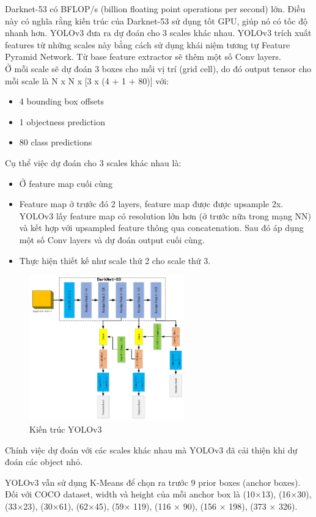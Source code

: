 \noindent Darknet-53 có BFLOP/s (billion floating point operations per second) lớn. Điều này có nghĩa rằng kiến trúc của Darknet-53 sử dụng tốt GPU, giúp nó có tốc độ nhanh hơn.
YOLOv3 đưa ra dự đoán cho 3 scales khác nhau. YOLOv3 trích xuất features từ những scales này bằng cách sử dụng khái niệm tương tự Feature Pyramid Network. Từ base feature extractor sẽ thêm một số Conv layers.\\
Ở mỗi scale sẽ dự đoán 3 boxes cho mỗi vị trí (grid cell), do đó output tensor cho mỗi scale là N x N x [3 x (4 + 1 + 80)] với:
\begin{itemize}
    \item 4 bounding box offsets
    \item 1 objectness prediction
    \item 80 class predictions
\end{itemize}
Cụ thể việc dự đoán cho 3 scales khác nhau là:
\begin{itemize}
    \item Ở feature map cuối cùng
    \item Feature map ở trước đó 2 layers, feature map được được upsample 2x. YOLOv3 lấy feature map có resolution lớn hơn (ở trước nữa trong mạng NN) và kết hợp với upsampled feature thông qua concatenation. Sau đó áp dụng một số Conv layers và dự đoán output cuối cùng.
    \item Thực hiện thiết kế như scale thứ 2 cho scale thứ 3.
\end{itemize}

\begin{figure}[htp]
    \centering
    \includegraphics[width=0.6\textwidth]{images/2a-sign/YOLOv3-arch.jpg}
    \caption{Kiến trúc YOLOv3}
\end{figure}

\noindent Chính việc dự đoán với các scales khác nhau mà YOLOv3 đã cải thiện khi dự đoán các object nhỏ.

\noindent YOLOv3 vẫn sử dụng K-Means để chọn ra trước 9 prior boxes (anchor boxes). Đối với COCO dataset, width và height của mỗi anchor box là (10×13), (16×30), (33×23), (30×61), (62×45), (59× 119), (116 × 90), (156 × 198), (373 × 326).





